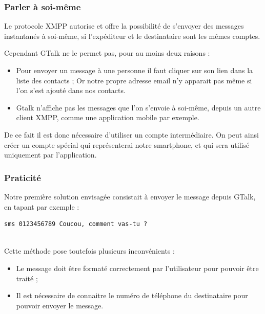 
\subsubsection{Parler à soi-même}

Le protocole XMPP autorise et offre la possibilité de s'envoyer des messages instantanés à soi-même, si l'expéditeur et le destinataire sont les mêmes comptes.

Cependant GTalk ne le permet pas, pour au moins deux raisons :
\begin{itemize}
	\item Pour envoyer un message à une personne il faut cliquer sur son lien dans la liste des contacts ;
	Or notre propre adresse email n'y apparait pas même si l'on s'est ajouté dans nos contacts.
	\item Gtalk n'affiche pas les messages que l'on s'envoie à soi-même, depuis un autre client XMPP, comme une application mobile par exemple.
\end{itemize}

De ce fait il est donc nécessaire d'utiliser un compte intermédiaire.
On peut ainsi créer un compte spécial qui représenterai notre smartphone, et qui sera utilisé uniquement par l'application.
\\


\subsubsection{Praticité}

Notre première solution envisagée consistait à envoyer le message depuis GTalk, en tapant par exemple :
\begin{lstlisting}
sms 0123456789 Coucou, comment vas-tu ?
\end{lstlisting}
~~\\

Cette méthode pose toutefois plusieurs inconvénients :
\begin{itemize}
	\item Le message doit être formaté correctement par l'utilisateur pour pouvoir être traité ;
	\item Il est nécessaire de connaitre le numéro de téléphone du destinataire pour pouvoir envoyer le message.
\end{itemize}
~~\\



